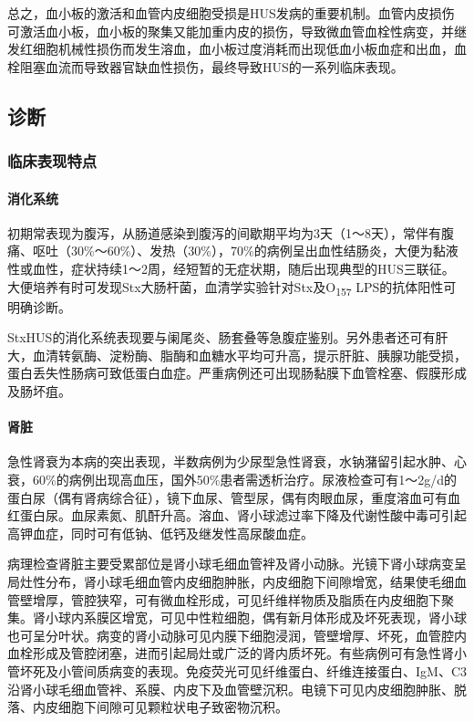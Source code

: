 总之，血小板的激活和血管内皮细胞受损是HUS发病的重要机制。血管内皮损伤可激活血小板，血小板的聚集又能加重内皮的损伤，导致微血管血栓性病变，并继发红细胞机械性损伤而发生溶血，血小板过度消耗而出现低血小板血症和出血，血栓阻塞血流而导致器官缺血性损伤，最终导致HUS的一系列临床表现。

\subsection{诊断}

\subsubsection{临床表现特点}

\paragraph{消化系统}

初期常表现为腹泻，从肠道感染到腹泻的间歇期平均为3天（1～8天），常伴有腹痛、呕吐（30\%～60\%）、发热（30\%），70\%的病例呈出血性结肠炎，大便为黏液性或血性，症状持续1～2周，经短暂的无症状期，随后出现典型的HUS三联征。大便培养有时可发现Stx大肠杆菌，血清学实验针对Stx及O\textsubscript{157}
LPS的抗体阳性可明确诊断。

StxHUS的消化系统表现要与阑尾炎、肠套叠等急腹症鉴别。另外患者还可有肝大，血清转氨酶、淀粉酶、脂酶和血糖水平均可升高，提示肝脏、胰腺功能受损，蛋白丢失性肠病可致低蛋白血症。严重病例还可出现肠黏膜下血管栓塞、假膜形成及肠坏疽。

\paragraph{肾脏}

急性肾衰为本病的突出表现，半数病例为少尿型急性肾衰，水钠潴留引起水肿、心衰，60\%的病例出现高血压，国外50\%患者需透析治疗。尿液检查可有1～2g/d的蛋白尿（偶有肾病综合征），镜下血尿、管型尿，偶有肉眼血尿，重度溶血可有血红蛋白尿。血尿素氮、肌酐升高。溶血、肾小球滤过率下降及代谢性酸中毒可引起高钾血症，同时可有低钠、低钙及继发性高尿酸血症。

病理检查肾脏主要受累部位是肾小球毛细血管袢及肾小动脉。光镜下肾小球病变呈局灶性分布，肾小球毛细血管内皮细胞肿胀，内皮细胞下间隙增宽，结果使毛细血管壁增厚，管腔狭窄，可有微血栓形成，可见纤维样物质及脂质在内皮细胞下聚集。肾小球内系膜区增宽，可见中性粒细胞，偶有新月体形成及坏死表现，肾小球也可呈分叶状。病变的肾小动脉可见内膜下细胞浸润，管壁增厚、坏死，血管腔内血栓形成及管腔闭塞，进而引起局灶或广泛的肾内质坏死。有些病例可有急性肾小管坏死及小管间质病变的表现。免疫荧光可见纤维蛋白、纤维连接蛋白、IgM、C3沿肾小球毛细血管袢、系膜、内皮下及血管壁沉积。电镜下可见内皮细胞肿胀、脱落、内皮细胞下间隙可见颗粒状电子致密物沉积。

